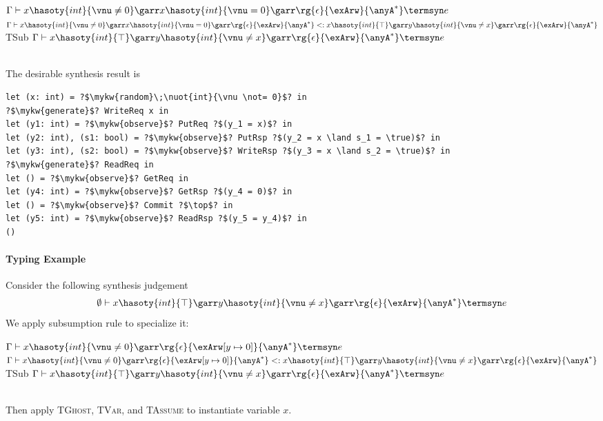 {\footnotesize\mprooftr{90mm}
{$\Gamma \vdash x\hasoty{int}{\vnu \not= 0}\garr x\hasoty{int}{\vnu =  0}\garr \rg{\epsilon}{\exArw}{\anyA^*} \termsyn e$ \quad 
 $\Gamma \vdash x\hasoty{int}{\vnu \not= 0}\garr x\hasoty{int}{\vnu =  0}\garr \rg{\epsilon}{\exArw}{\anyA^*} <: x\hasoty{int}{\top}\garr y\hasoty{int}{\vnu \not = x}\garr \rg{\epsilon}{\exArw}{\anyA^*}$}
{TSub}
{$\Gamma \vdash x\hasoty{int}{\top}\garr y\hasoty{int}{\vnu \not = x}\garr \rg{\epsilon}{\exArw}{\anyA^*} \termsyn e$}}
\\ \ 

The desirable synthesis result is

\begin{verbatim}
let (x: int) = ?$\mykw{random}\;\nuot{int}{\vnu \not= 0}$? in
?$\mykw{generate}$? WriteReq x in
let (y1: int) = ?$\mykw{observe}$? PutReq ?$(y_1 = x)$? in
let (y2: int), (s1: bool) = ?$\mykw{observe}$? PutRsp ?$(y_2 = x \land s_1 = \true)$? in
let (y3: int), (s2: bool) = ?$\mykw{observe}$? WriteRsp ?$(y_3 = x \land s_2 = \true)$? in
?$\mykw{generate}$? ReadReq in
let () = ?$\mykw{observe}$? GetReq in
let (y4: int) = ?$\mykw{observe}$? GetRsp ?$(y_4 = 0)$? in
let () = ?$\mykw{observe}$? Commit ?$\top$? in
let (y5: int) = ?$\mykw{observe}$? ReadRsp ?$(y_5 = y_4)$? in
()
\end{verbatim}

\paragraph{Typing Example} Consider the following synthesis judgement
\begin{align*}
    \emptyset \vdash x\hasoty{int}{\top}\garr y\hasoty{int}{\vnu \not = x}\garr \rg{\epsilon}{\exArw}{\anyA^*} \termsyn e
\end{align*}\noindent
We apply subsumption rule to specialize it:

{\footnotesize\mprooftr{110mm}
{$\Gamma \vdash x\hasoty{int}{\vnu \not= 0}\garr \rg{\epsilon}{\exArw[y \mapsto 0]}{\anyA^*} \termsyn e$ \quad 
 $\Gamma \vdash x\hasoty{int}{\vnu \not= 0}\garr \rg{\epsilon}{\exArw[y \mapsto 0]}{\anyA^*} <: x\hasoty{int}{\top}\garr y\hasoty{int}{\vnu \not = x}\garr \rg{\epsilon}{\exArw}{\anyA^*}$}
{TSub}
{$\Gamma \vdash x\hasoty{int}{\top}\garr y\hasoty{int}{\vnu \not = x}\garr \rg{\epsilon}{\exArw}{\anyA^*} \termsyn e$}}
\\ \ 

Then apply \textsc{TGhost}, \textsc{TVar}, and \textsc{TAssume} to instantiate variable $x$. 

